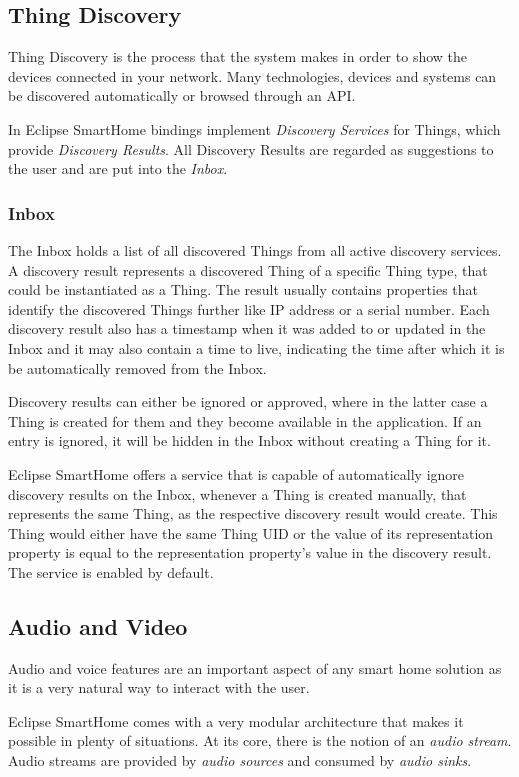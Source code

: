 \subsection{Thing Discovery}
Thing Discovery is the process that the system makes in order to show the devices connected in your network. Many technologies, 
devices and systems can be discovered automatically or browsed through an API.

In Eclipse SmartHome bindings implement \textit{Discovery Services} for Things, which provide \textit{Discovery Results}. All Discovery 
Results are regarded as suggestions to the user and are put into the \textit{Inbox}.

\subsubsection{Inbox}
The Inbox holds a list of all discovered Things from all active discovery services. A discovery result represents a discovered Thing of a 
specific Thing type, that could be instantiated as a Thing. The result usually contains properties that identify the discovered Things 
further like IP address or a serial number. Each discovery result also has a timestamp when it was added to or updated in the Inbox 
and it may also contain a time to live, indicating the time after which it is be automatically removed from the Inbox.

Discovery results can either be ignored or approved, where in the latter case a Thing is created for them and they become available in 
the application. If an entry is ignored, it will be hidden in the Inbox without creating a Thing for it.

Eclipse SmartHome offers a service that is capable of automatically ignore discovery results on the Inbox, whenever a Thing is created
manually, that represents the same Thing, as the respective discovery result would create. This Thing would either have the same Thing
UID or the value of its representation property is equal to the representation property's value in the discovery result. The service is
enabled by default.

\subsection{Audio and Video}
Audio and voice features are an important aspect of any smart home solution as it is a very natural way to interact with the user.

Eclipse SmartHome comes with a very modular architecture that makes it possible in plenty of situations. At its core, there is the notion
of an \textit{audio stream}. Audio streams are provided by \textit{audio sources} and consumed by \textit{audio sinks}.

